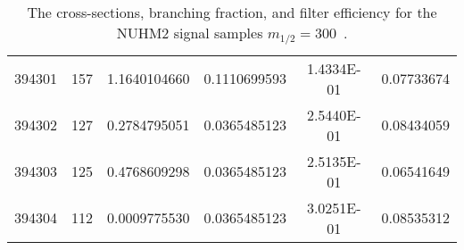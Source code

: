 \begin{table}[htp]
{{\begin{tabular}{cccccc}
                394301 & 157         & 1.1640104660         & 0.1110699593 & 1.4334E-01        & 0.07733674\\
                394302 & 127         & 0.2784795051         & 0.0365485123 & 2.5440E-01        & 0.08434059\\
                394303 & 125         & 0.4768609298         & 0.0365485123 & 2.5135E-01        & 0.06541649\\
                394304 & 112         & 0.0009775530         & 0.0365485123 & 3.0251E-01        & 0.08535312\\
                \hline
                \hline
            \end{tabular}
        }
    }
    \caption{The cross-sections, branching fraction, and filter efficiency for the NUHM2 signal samples $m_{1/2} = 300$~{\GeV}.}
    \label{tab:app_xsec_m12_300}
\end{table}%

